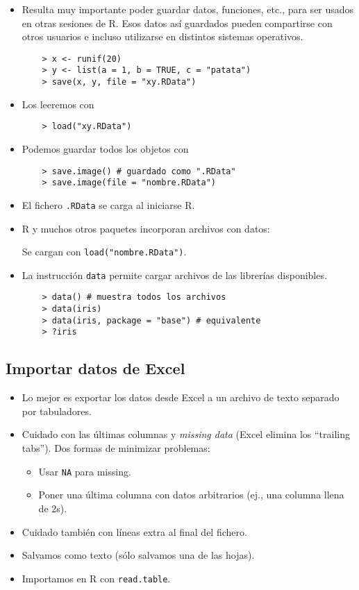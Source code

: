 \begin{itemize}
    \item Resulta muy importante poder guardar datos, funciones, etc., para
    ser usados en otras sesiones de R. Esos datos así guardados pueden
    compartirse con otros usuarios e incluso utilizarse en distintos
    sistemas operativos.
    \begin{verbatim}
    > x <- runif(20)
    > y <- list(a = 1, b = TRUE, c = "patata")
    > save(x, y, file = "xy.RData")
    \end{verbatim}
    \item Los leeremos con
    \begin{verbatim}
    > load("xy.RData")
    \end{verbatim}

\newslide

    \item Podemos guardar todos los objetos con
    \begin{verbatim}
    > save.image() # guardado como ".RData"
    > save.image(file = "nombre.RData")
    \end{verbatim}
    \item  El fichero \verb".RData" se carga al iniciarse R.
    
    \item R y muchos otros paquetes incorporan archivos con datos:

    Se cargan con \verb[load("nombre.RData")[.

    \item La instrucción \verb"data" permite cargar archivos
    de las librerías disponibles.
    \begin{verbatim}
    > data() # muestra todos los archivos
    > data(iris)
    > data(iris, package = "base") # equivalente
    > ?iris
    \end{verbatim}
\end{itemize}

\subsection{Importar datos de Excel}

\begin{itemize}
    \item Lo mejor es exportar los datos desde Excel a un archivo
    de texto separado por tabuladores.
    \item Cuidado con las últimas columnas y \emph{missing data}
    (Excel elimina los ``trailing tabs''). Dos formas de minimizar
    problemas: \begin{itemize}
        \item Usar \verb"NA" para missing.
        \item Poner una última columna con datos arbitrarios (ej.,
        una columna llena de 2s).
    \end{itemize}
    \item Cuidado también con líneas extra al final del fichero.
    \item Salvamos como texto (sólo salvamos una de las hojas).
    \item Importamos en R con \verb"read.table".
\end{itemize}

